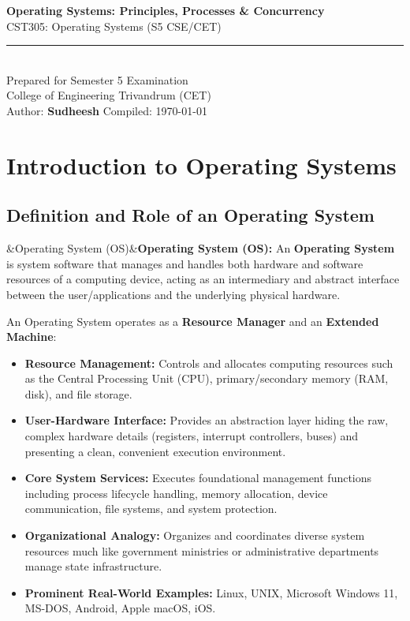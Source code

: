 \documentclass[11pt,a4paper]{article}
\newcommand{\docsubject}{CST305: Operating Systems (S5 CSE/CET)}
\newcommand{\doctitle}{Operating Systems: Principles, Processes \& Concurrency}
\newcommand{\docauthor}{Sudheesh}
\newenvironment{Def}[1][]{\begin{tcolorbox}[defbox]\ifx&#1&\else\textbf{#1:}\enspace\fi}{\end{tcolorbox}}
\newcommand{\maketitlepage}{%
  \begin{titlepage}
    \pagecolor{AnthDark}
    \color{AnthLight}
    \vspace*{3.5cm}
    \begin{center}
      {\Huge\bfseries\sffamily \doctitle}\\[0.8em]
      {\Large\sffamily\color{AnthOrange} \docsubject}\\[2.5em]
      \color{AnthMidGray}\rule{0.45\textwidth}{0.4pt}\\[2.0em]
      {\large\sffamily Prepared for Semester 5 Examination}\\[0.5em]
      {\normalsize\sffamily\color{AnthLightGray} College of Engineering Trivandrum (CET)}\\[2.5em]
      {\small\sffamily\color{AnthMidGray} Author: \textbf{\docauthor} \quad\textbar\quad Compiled: \today}
    \end{center}
    \vfill
  \end{titlepage}
  \pagecolor{AnthLight}
  \color{AnthDark}
}
\begin{document}
\maketitlepage

\thispagestyle{empty}
{
  \hypersetup{hidelinks}
  \tableofcontents
}
\newpage

\section{Introduction to Operating Systems}

\subsection{Definition and Role of an Operating System}

\begin{Def}[Operating System (OS)]
An \textbf{Operating System} is system software that manages and handles both hardware and software resources of a computing device, acting as an intermediary and abstract interface between the user/applications and the underlying physical hardware.
\end{Def}

An Operating System operates as a \textbf{Resource Manager} and an \textbf{Extended Machine}:
\begin{itemize}
    \item \textbf{Resource Management:} Controls and allocates computing resources such as the Central Processing Unit (CPU), primary/secondary memory (RAM, disk), and file storage.
    \item \textbf{User-Hardware Interface:} Provides an abstraction layer hiding the raw, complex hardware details (registers, interrupt controllers, buses) and presenting a clean, convenient execution environment.
    \item \textbf{Core System Services:} Executes foundational management functions including process lifecycle handling, memory allocation, device communication, file systems, and system protection.
    \item \textbf{Organizational Analogy:} Organizes and coordinates diverse system resources much like government ministries or administrative departments manage state infrastructure.
    \item \textbf{Prominent Real-World Examples:} Linux, UNIX, Microsoft Windows 11, MS-DOS, Android, Apple macOS, iOS.
\end{itemize}
\end{document}
